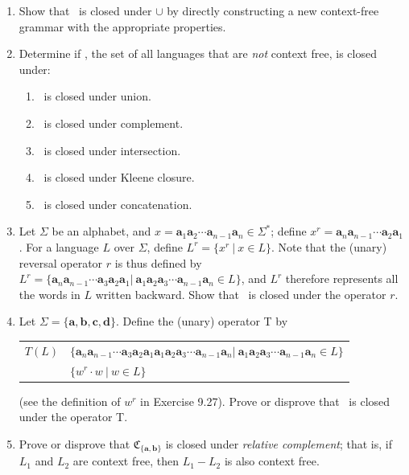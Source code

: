 \begin{enumerate}[{9.}1.]
\item Show that \CSIG\ is closed under $\cup$ by directly constructing a new
context-free grammar with the appropriate properties.

\item Determine if \XSIG, the set of all languages that are \emph{not} context
free, is closed under:
\begin{enumerate}
\item \XSIG\ is closed under union.
\item \XSIG\ is closed under complement.
\item \XSIG\ is closed under intersection.
\item \XSIG\ is closed under Kleene closure.
\item \XSIG\ is closed under concatenation.
\end{enumerate}

\item Let $\Sigma$ be an alphabet, and $x=\pmb{a}_1\pmb{a}_2\cdots\pmb{a}_{n-1}
\pmb{a}_n\in\Sigma^*$; define $x^r=\pmb{a}_n\pmb{a}_{n-1}\cdots\pmb{a}_2\pmb{a}_1$.
For a language $L$ over $\Sigma$, define $L^r=\{x^r\ |\ x\in L\}$. Note that the
(unary) reversal operator $r$ is thus defined by $L^r=\{\pmb{a}_n\pmb{a}_{n-1}
\cdots\pmb{a}_3\pmb{a}_2\pmb{a}_1 |\ \pmb{a}_1\pmb{a}_2\pmb{a}_3\cdots\pmb{a}_{n-1}
\pmb{a}_n\in L\}$, and $L^r$ therefore represents all the words in $L$ written
backward. Show that \CSIG\ is closed under the operator $r$.

\item Let $\Sigma=\{\pmb{a},\pmb{b},\pmb{c},\pmb{d}\}$. Define the (unary)
operator T by
\begin{center}\begin{tabular}{r@{ = }l}
$T(L)$ & $\{\pmb{a}_n\pmb{a}_{n-1}\cdots\pmb{a}_3\pmb{a}_2\pmb{a}_1\pmb{a}_1
	\pmb{a}_2\pmb{a}_3\cdots\pmb{a}_{n-1}\pmb{a}_n |\ \pmb{a}_1\pmb{a}_2
	\pmb{a}_3\cdots\pmb{a}_{n-1}\pmb{a}_n\in L\}$ \\
& $\{w^r \cdot w\ |\ w\in L\}$
\end{tabular}\end{center}
(see the definition of $w^r$ in Exercise 9.27). Prove or disprove that \CSIG\ is
closed under the operator T.

\item Prove or disprove that $\mathfrak{C}_{\{\pmb{a},\pmb{b}\}}$ is closed
under \emph{relative complement}; that is, if $L_1$ and $L_2$ are context free,
then $L_1 - L_2$ is also context free.


\end{enumerate}
